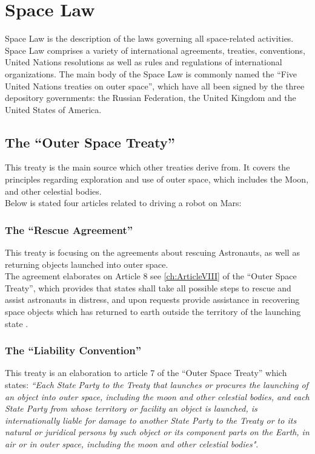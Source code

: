 \chapter{Space Law} \label{ch:Spacelaw}
Space Law is the description of the laws governing all space-related activities.
Space Law comprises a variety of international agreements, treaties, conventions, United Nations resolutions as well as rules and regulations of international organizations. The main body of the Space Law is commonly named the “Five United Nations treaties on outer space”, which have all been signed by the three depository governments: the Russian Federation, the United Kingdom and the United States of America.

\section{The “Outer Space Treaty”}
This treaty is the main source which other treaties derive from. It covers the principles regarding exploration and use of outer space, which includes the Moon, and other celestial bodies.\\
Below is stated four articles related to driving a robot on Mars:

\subsection{The “Rescue Agreement”}
This treaty is focusing on the agreements about rescuing Astronauts, as well as returning objects launched into outer space.\\
The agreement elaborates on Article 8 see \ref{ch:ArticleVIII} of the “Outer Space Treaty”, which provides that states shall take all possible steps to rescue and assist astronauts in distress, and upon requests provide assistance in recovering space objects which has returned to earth outside the territory of the launching state \cite{Treaty2}.

\subsection{The “Liability Convention”}
This treaty is an elaboration to article 7 of the “Outer Space Treaty” which states:
\textit{“Each State Party to the Treaty that launches or procures the launching of an object into outer space, including the moon and other celestial bodies, and each State Party from whose territory or facility an object is launched, is internationally liable for damage to another State Party to the Treaty or to its natural or juridical persons by such object or its component parts on the Earth, in air or in outer space, including the moon and other celestial bodies"}\cite{Treaty3}.

